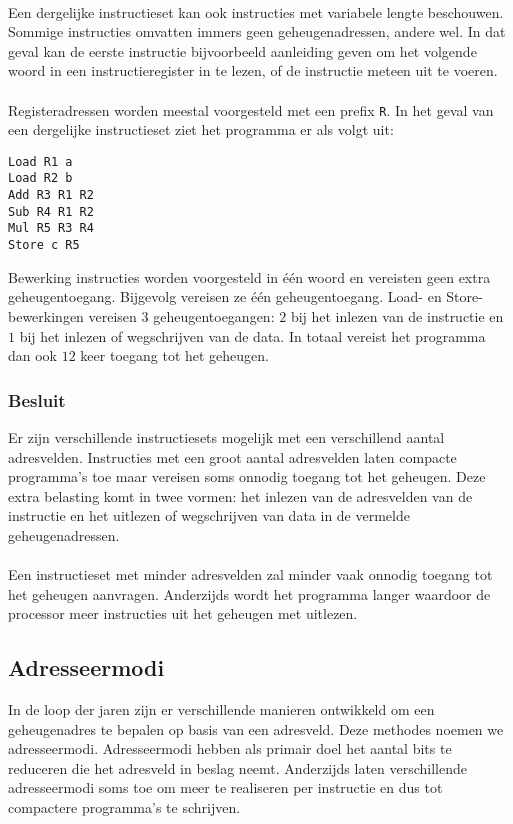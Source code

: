 \paragraph{}
Een dergelijke instructieset kan ook instructies met variabele lengte beschouwen. Sommige instructies omvatten immers geen geheugenadressen, andere wel. In dat geval kan de eerste instructie bijvoorbeeld aanleiding geven om het volgende woord in een instructieregister in te lezen, of de instructie meteen uit te voeren.
\paragraph{}
Registeradressen worden meestal voorgesteld met een prefix \verb+R+. In het geval van een dergelijke instructieset ziet het programma er als volgt uit:
\begin{verbatim}
Load R1 a
Load R2 b
Add R3 R1 R2
Sub R4 R1 R2
Mul R5 R3 R4
Store c R5
\end{verbatim}
Bewerking instructies worden voorgesteld in \'e\'en woord en vereisten geen extra geheugentoegang. Bijgevolg vereisen ze \'e\'en geheugentoegang. Load- en Store-bewerkingen vereisen $3$ geheugentoegangen: $2$ bij het inlezen van de instructie en $1$ bij het inlezen of wegschrijven van de data. In totaal vereist het programma dan ook $12$ keer toegang tot het geheugen.
\subsubsection{Besluit}
Er zijn verschillende instructiesets mogelijk met een verschillend aantal adresvelden. Instructies met een groot aantal adresvelden laten compacte programma's toe maar vereisen soms onnodig toegang tot het geheugen. Deze extra belasting komt in twee vormen: het inlezen van de adresvelden van de instructie en het uitlezen of wegschrijven van data in de vermelde geheugenadressen.
\paragraph{}
Een instructieset met minder adresvelden zal minder vaak onnodig toegang tot het geheugen aanvragen. Anderzijds wordt het programma langer waardoor de processor meer instructies uit het geheugen met uitlezen.
\subsection{Adresseermodi}
In de loop der jaren zijn er verschillende manieren ontwikkeld om een geheugenadres te bepalen op basis van een adresveld. Deze methodes noemen we adresseermodi. Adresseermodi hebben als primair doel het aantal bits te reduceren die het adresveld in beslag neemt. Anderzijds laten verschillende adresseermodi soms toe om meer te realiseren per instructie en dus tot compactere programma's te schrijven.

